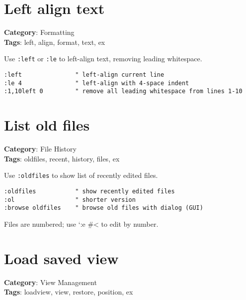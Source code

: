 {{{{\section{Left align text}

\textbf{Category}: Formatting\\ \textbf{Tags}: left, align, format, text, ex
\vspace{0.5cm}

Use {\footnotesize \Verb§:left§} or {\footnotesize \Verb§:le§} to left-align text, removing leading whitespace.

\begin{Exa*}{}
\begin{Verbatim}[fontsize=\footnotesize, breaklines, breakanywhere]
:left               " left-align current line
:le 4               " left-align with 4-space indent
:1,10left 0         " remove all leading whitespace from lines 1-10
\end{Verbatim}
\end{Exa*}

\section{List old files}

\textbf{Category}: File History\\ \textbf{Tags}: oldfiles, recent, history, files, ex
\vspace{0.5cm}

Use {\footnotesize \Verb§:oldfiles§} to show list of recently edited files.

\begin{Exa*}{}
\begin{Verbatim}[fontsize=\footnotesize, breaklines, breakanywhere]
:oldfiles           " show recently edited files
:ol                 " shorter version
:browse oldfiles    " browse old files with dialog (GUI)
\end{Verbatim}
\end{Exa*}

Files are numbered; use `:e \#< to edit by number.

\section{Load saved view}

\textbf{Category}: View Management\\ \textbf{Tags}: loadview, view, restore, position, ex
\vspace{0.5cm}

}}}}
